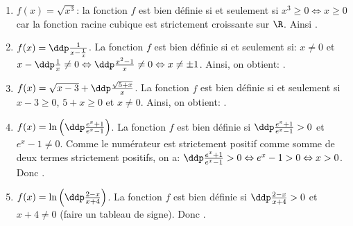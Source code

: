 \begin{correction}  \;
\begin{enumerate}
 \item $f(x)=\sqrt{x^3}$: la fonction $f$ est bien d\'efinie si et seulement si $x^3\geq 0\Leftrightarrow x\geq 0$ car la fonction racine cubique est strictement croissante sur $\R$. Ainsi .
\item $f(x)= \ddp\frac{1}{x-\frac{1}{x}}$. La fonction $f$ est bien d\'efinie si et seulement si: $x\not= 0$ et $x-\ddp\frac{1}{x}\not= 0\Leftrightarrow \ddp\frac{x^2-1}{x}\not= 0\Leftrightarrow x\not=\pm 1$. Ainsi, on obtient: .
\item $f(x)=\sqrt{x-3} +\ddp\frac{\sqrt{5+x}}{x} $. La fonction $f$ est bien d\'efinie si et seulement si $x-3\geq 0$, $5+x\geq 0$ et $x\not= 0$. Ainsi, on obtient: .
\item $f(x)=\ln{\left(\ddp\frac{e^x+1}{e^x-1}\right)}$. La fonction $f$ est bien d\'efinie si $\ddp\frac{e^x+1}{e^x-1}>0$ et $e^x-1\not= 0$. Comme le num\'erateur est strictement positif comme somme de deux termes strictement positifs, on a: $\ddp\frac{e^x+1}{e^x-1}>0\Leftrightarrow e^x-1>0\Leftrightarrow x>0$. Donc .
\item $f(x) = \ln{\left(\ddp\frac{2-x}{x+4}\right)}$. La fonction $f$ est bien d\'efinie si $\ddp\frac{2-x}{x+4}>0$ et $x+4\not= 0$ (faire un tableau de signe). Donc .
\end{enumerate}
\end{correction}